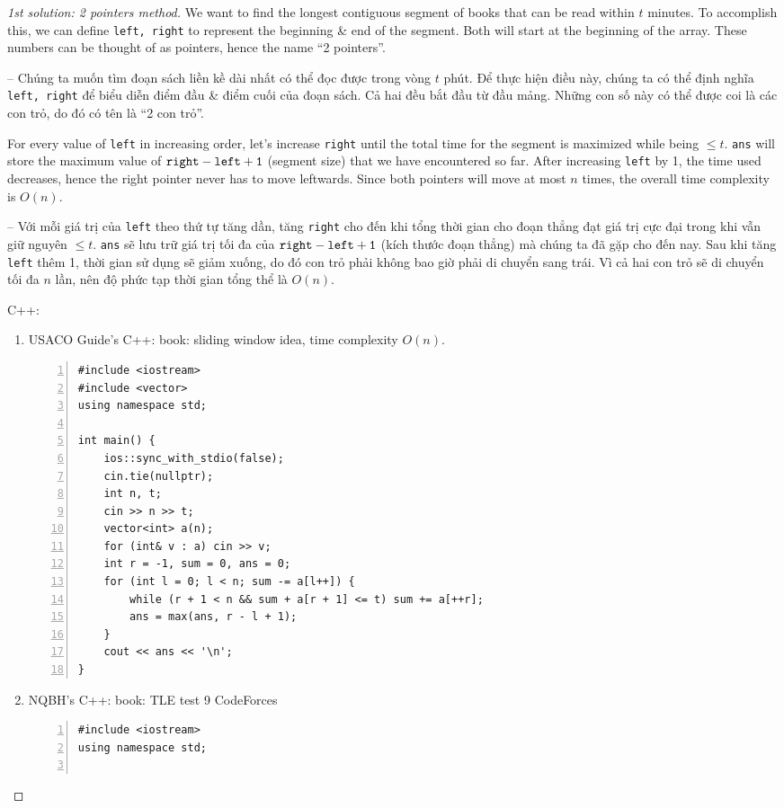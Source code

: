 \documentclass{article}
\begin{document}
\begin{proof}[1st solution: 2 pointers method]
    We want to find the longest contiguous segment of books that can be read within $t$ minutes. To accomplish this, we can define {\tt left, right} to represent the beginning \& end of the segment. Both will start at the beginning of the array. These numbers can be thought of as pointers, hence the name ``2 pointers''.

    -- Chúng ta muốn tìm đoạn sách liền kề dài nhất có thể đọc được trong vòng $t$ phút. Để thực hiện điều này, chúng ta có thể định nghĩa {\tt left, right} để biểu diễn điểm đầu \& điểm cuối của đoạn sách. Cả hai đều bắt đầu từ đầu mảng. Những con số này có thể được coi là các con trỏ, do đó có tên là ``2 con trỏ''.

    For every value of {\tt left} in increasing order, let's increase {\tt right} until the total time for the segment is maximized while being $\le t $. {\tt ans} will store the maximum value of $\tt right - left + 1$ (segment size) that we have encountered so far. After increasing {\tt left} by 1, the time used decreases, hence the right pointer never has to move leftwards. Since both pointers will move at most $n$ times, the overall time complexity is $O(n)$.

    -- Với mỗi giá trị của {\tt left} theo thứ tự tăng dần, tăng {\tt right} cho đến khi tổng thời gian cho đoạn thẳng đạt giá trị cực đại trong khi vẫn giữ nguyên $\le t $. {\tt ans} sẽ lưu trữ giá trị tối đa của $\tt right - left + 1$ (kích thước đoạn thẳng) mà chúng ta đã gặp cho đến nay. Sau khi tăng {\tt left} thêm 1, thời gian sử dụng sẽ giảm xuống, do đó con trỏ phải không bao giờ phải di chuyển sang trái. Vì cả hai con trỏ sẽ di chuyển tối đa $n$ lần, nên độ phức tạp thời gian tổng thể là $O(n)$.

    C++:
    \begin{enumerate}
        \item USACO Guide's C++: book: sliding window idea, time complexity $O(n)$.
        \begin{Verbatim}[numbers=left,xleftmargin=5mm]
#include <iostream>
#include <vector>
using namespace std;

int main() {
    ios::sync_with_stdio(false);
    cin.tie(nullptr);
    int n, t;
    cin >> n >> t;
    vector<int> a(n);
    for (int& v : a) cin >> v;
    int r = -1, sum = 0, ans = 0;
    for (int l = 0; l < n; sum -= a[l++]) {
        while (r + 1 < n && sum + a[r + 1] <= t) sum += a[++r];
        ans = max(ans, r - l + 1);
    }
    cout << ans << '\n';
}
        \end{Verbatim}
        \item NQBH's C++: book: TLE test 9 CodeForces
        \begin{Verbatim}[numbers=left,xleftmargin=5mm]
#include <iostream>
using namespace std;


\end{Verbatim}
\end{enumerate}
\end{proof}
\end{document}
